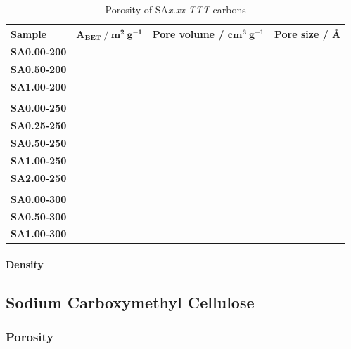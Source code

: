 \begin{table}[h]
    \caption{Porosity of SA\textit{x.xx-TTT} carbons}
    \label{tb:nc_porosity}
    \begin{tabularx}{\textwidth}{lllXXll}
    \toprule
        \textbf{Sample} & \multicolumn{2}{l}{$\mathbf{A_{BET}\ /\ m^2\ g^{-1}}$}  & \multicolumn{2}{l}{\textbf{Pore volume} / $\mathbf{cm^3\ g^{-1}}$} & \multicolumn{2}{l}{\textbf{Pore size / \AA}} \\
    \midrule
        \textbf{SA0.00-200} & & & & & \\
        \textbf{SA0.50-200} & & & & & \\
        \textbf{SA1.00-200} & & & & & \\
        \\
        \textbf{SA0.00-250} & & & & & \\
        \textbf{SA0.25-250} & & & & & \\
        \textbf{SA0.50-250} & & & & & \\
        \textbf{SA1.00-250} & & & & & \\
        \textbf{SA2.00-250} & & & & & \\
        \\
        \textbf{SA0.00-300} & & & & & \\
        \textbf{SA0.50-300} & & & & & \\
        \textbf{SA1.00-300} & & & & & \\
    \bottomrule
    \end{tabularx}
\end{table}

\paragraph{Density}

\subsection{Sodium Carboxymethyl Cellulose}

\subsubsection{Porosity}

